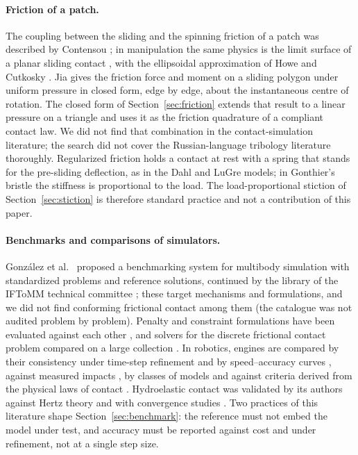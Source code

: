 \paragraph{Friction of a patch.} The coupling between the sliding and the spinning friction of
a patch was described by Contensou \cite{Contensou1963}; in manipulation the same physics is
the limit surface of a planar sliding contact \cite{Goyal1991}, with the ellipsoidal
approximation of Howe and Cutkosky \cite{Howe1996}. Jia \cite{Jia1997} gives the friction force
and moment on a sliding polygon under uniform pressure in closed form, edge by edge, about the
instantaneous centre of rotation. The closed form of Section~\ref{sec:friction} extends that
result to a linear pressure on a triangle and uses it as the friction quadrature of a compliant
contact law. We did not find that combination in the contact-simulation literature; the search
did not cover the Russian-language tribology literature thoroughly. Regularized friction holds
a contact at rest with a spring that stands for the pre-sliding deflection, as in the Dahl
\cite{Dahl1976} and LuGre \cite{CanudasDeWit1995} models; in Gonthier's bristle
\cite{Gonthier2007thesis} the stiffness is proportional to the load. The load-proportional
stiction of Section~\ref{sec:stiction} is therefore standard practice and not a contribution of
this paper.

\paragraph{Benchmarks and comparisons of simulators.} Gonz\'alez et
al.~\cite{Gonzalez2006,Gonzalez2010} proposed a benchmarking system for multibody simulation
with standardized problems and reference solutions, continued by the library of the IFToMM
technical committee \cite{IFToMMBenchmark}; these target mechanisms and formulations, and we
did not find conforming frictional contact among them (the catalogue was not audited problem by
problem). Penalty and constraint formulations have been evaluated against each other
\cite{Drumwright2011}, and solvers for the discrete frictional contact problem compared on a
large collection \cite{Acary2018}. In robotics, engines are compared by their consistency under
time-step refinement and by speed--accuracy curves \cite{Erez2015}, against measured impacts
\cite{Acosta2022}, by classes of models \cite{Horak2019} and against criteria derived from the
physical laws of contact \cite{LeLidec2024}. Hydroelastic contact was validated by its authors
against Hertz theory and with convergence studies \cite{Elandt2019,Masterjohn2022}. Two
practices of this literature shape Section~\ref{sec:benchmark}: the reference must not embed
the model under test, and accuracy must be reported against cost and under refinement, not at a
single step size.
